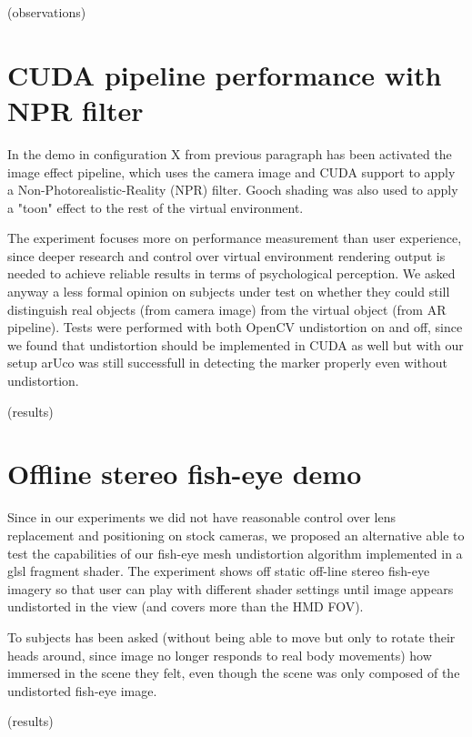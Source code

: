 (observations)

\section{CUDA pipeline performance with NPR filter}
In the demo in configuration X from previous paragraph has been activated the image effect pipeline, which uses the camera image and CUDA support to apply a Non-Photorealistic-Reality (NPR) filter. Gooch shading was also used to apply a "toon" effect to the rest of the virtual environment.

The experiment focuses more on performance measurement than user experience, since deeper research and control over virtual environment rendering output is needed to achieve reliable results in terms of psychological perception. We asked anyway a less formal opinion on subjects under test on whether they could still distinguish real objects (from camera image) from the virtual object (from AR pipeline). Tests were performed with both OpenCV undistortion on and off, since we found that undistortion should be implemented in CUDA as well but with our setup arUco was still successfull in detecting the marker properly even without undistortion.

(results)


\section{Offline stereo fish-eye demo}
Since in our experiments we did not have reasonable control over lens replacement and positioning on stock cameras, we proposed an alternative able to test the capabilities of our fish-eye mesh undistortion algorithm implemented in a glsl fragment shader. The experiment shows off static off-line stereo fish-eye imagery so that user can play with different shader settings until image appears undistorted in the view (and covers more than the HMD FOV).

To subjects has been asked (without being able to move but only to rotate their heads around, since image no longer responds to real body movements) how immersed in the scene they felt, even though the scene was only composed of the undistorted fish-eye image.

(results)



